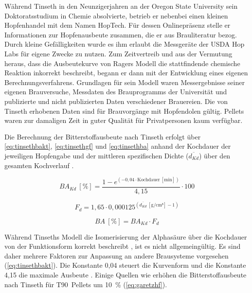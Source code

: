 \documentclass[a4paper,parskip=half]{scrartcl}
\newcommand{\BA}{\mathit{BA}}
\newcommand{\BAKt}{{\mathit{BA}}_{\mathit{Kd}}}
\newcommand{\umin}{\:[\textrm{min}]}
\newcommand{\uden}{\:[\text{g/cm³}]}
\newcommand{\uper}{\:[\text{\%}]}
\newcommand{\FKd}{F_{\mathit{d}}}
\newcommand{\dKt}{\overline{d_{\mathit{Kd}}}}
\begin{document}
Während Tinseth in den Neunzigerjahren an der Oregon State University sein Doktoratsstudium in Chemie absolvierte, betrieb er nebenbei einen kleinen Hopfenhandel mit dem Namen HopTech. Für dessen Onlinepräsenz stelle er Informationen zur Hopfenausbeute zusammen, die er aus Brauliteratur bezog. Durch kleine Gefälligkeiten wurde es ihm erlaubt die Messgeräte der USDA Hop Labs für eigene Zwecke zu nutzen. Zum Zeitvertreib und aus der Vermutung heraus, dass die Ausbeutekurve von Ragers Modell die stattfindende chemische Reaktion inkorrekt beschreibt, begann er dann mit der Entwicklung eines eigenen Berechnungsverfahrens. Grundlagen für sein Modell waren Messergebnisse seiner eigenen Brauversuche, Messdaten des Brauprogramms der Universität und publizierte und nicht publizierten Daten verschiedener Brauereien. Die von Tinseth erhobenen Daten sind für Brauvorgänge mit Hopfendolen gültig. Pellets waren zur damaligen Zeit in guter Qualität für Privatpersonen kaum verfügbar. \parencites[0:55:45-1:08:00]{Beechum2017a}[2:10-6:30]{Smith2011}

Die Berechnung der Bitterstoffausbeute nach Tinseth erfolgt über \autoref{eq:tinsethbakt}, \autoref{eq:tinsethgf} und \autoref{eq:tinsethba} anhand der Kochdauer der jeweiligen Hopfengabe und der mittleren spezifischen Dichte ($\dKt$) über den gesamten Kochverlauf \parencite{Tinseth1997}.

\begin{equation}
\BAKt \uper = \frac{1 - e^{\left(-0,04 \cdot \text{Kochdauer} \umin \right)}}{4,15} \cdot 100
\label{eq:tinsethbakt}
\end{equation}

\begin{equation}
\FKd = 1,65 \cdot 0,000125^{\left(\overline{d_{\mathit{Kd}}} \uden - 1 \right)}
\label{eq:tinsethgf}
\end{equation}

\begin{equation}
\BA \uper = \BAKt \cdot \FKd
\label{eq:tinsethba}
\end{equation}

Während Tinseths Modell die Isomerisierung der Alphasäure über die Kochdauer von der Funktionsform korrekt beschreibt \parencite[43]{Malowicki2005}, ist es nicht allgemeingültig. Es sind daher mehrere Faktoren zur Anpassung an andere Brausysteme vorgesehen (\autoref{eq:tinsethbakt}). Die Konstante 0,04 steuert die Kurvenform und die Konstante 4,15 die maximale Ausbeute \parencite{Tinseth1997}. Einige Quellen wie \textcite{Novotny2018} erhöhen die Bitterstoffausbeute nach Tinseth für T90~Pellets um 10~\% (\autoref{eq:garetzhf}).
\end{document}
